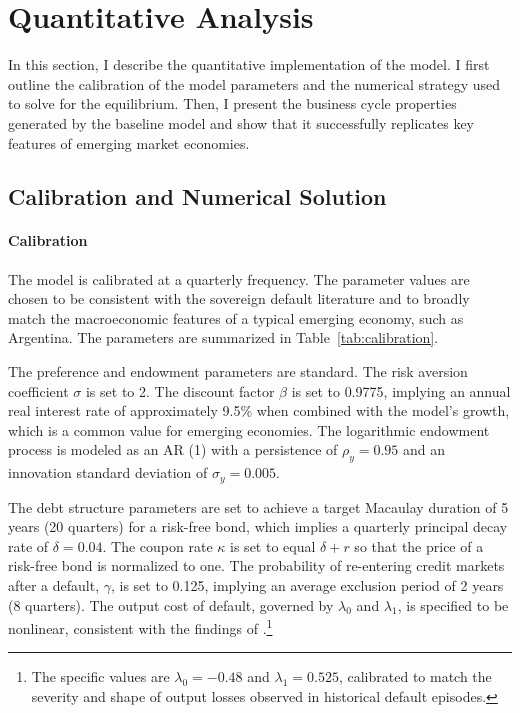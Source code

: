 \documentclass[12pt]{article}
\theoremstyle{plain}
\begin{document}
\section{Quantitative Analysis}
\label{sec:quant}

In this section, I describe the quantitative implementation of the model. I
first outline the calibration of the model parameters and the numerical
strategy used to solve for the equilibrium. Then, I present the business cycle
properties generated by the baseline model and show that it successfully
replicates key features of emerging market economies.

\subsection{Calibration and Numerical Solution}

\paragraph{Calibration}
The model is calibrated at a quarterly frequency. The parameter values are
chosen to be consistent with the sovereign default literature and to broadly
match the macroeconomic features of a typical emerging economy, such as
Argentina. The parameters are summarized in Table~\ref{tab:calibration}.

The preference and endowment parameters are standard. The risk aversion
coefficient $\sigma$ is set to 2. The discount factor $\beta$ is set to 0.9775,
implying an annual real interest rate of approximately 9.5\% when combined with
the model's growth, which is a common value for emerging economies. The
logarithmic endowment process is modeled as an AR (1) with a persistence of
$\rho_y=0.95$ and an innovation standard deviation of $\sigma_y=0.005$.

The debt structure parameters are set to achieve a target Macaulay duration of
5 years (20 quarters) for a risk-free bond, which implies a quarterly principal
decay rate of $\delta=0.04$. The coupon rate $\kappa$ is set to equal
$\delta+r$ so that the price of a risk-free bond is normalized to one. The
probability of re-entering credit markets after a default, $\gamma$, is set to
0.125, implying an average exclusion period of 2 years (8 quarters). The output
cost of default, governed by $\lambda_0$ and $\lambda_1$, is specified to be
nonlinear, consistent with the findings of
\citep{ChatterjeeEyigungor2012}.\footnote{The specific values are $\lambda_0 =
		-0.48$ and $\lambda_1 = 0.525$, calibrated to match the severity and shape of
	output losses observed in historical default episodes.}
\end{document}
